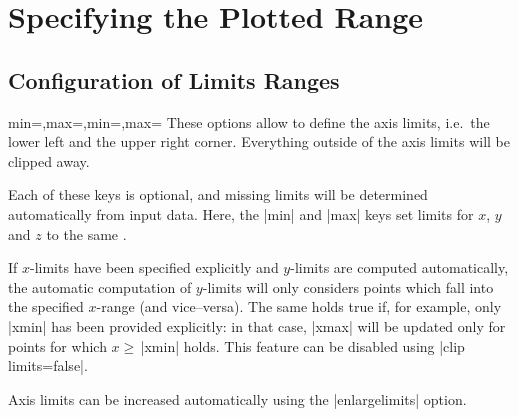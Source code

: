 

\section{Specifying the Plotted Range}

\subsection{Configuration of Limits Ranges}

\begin{pgfplotsxykeylist}{\x min=,\x max=,min=,max=}
These options allow to define the axis limits, i.e.\ the lower left and the upper right corner. Everything outside of the axis limits will be clipped away.

Each of these keys is optional, and missing limits will be determined automatically from input data. Here, the |min| and |max| keys set limits for $x$, $y$ and $z$ to the same .

If $x$-limits have been specified explicitly and $y$-limits are computed automatically, the automatic computation of $y$-limits will only considers points which fall into the specified $x$-range (and vice--versa). The same holds true if, for example, only |xmin| has been provided explicitly: in that case, |xmax| will be updated only for points for which $x \ge \,$|xmin| holds. This feature can be disabled using |clip limits=false|. 

Axis limits can be increased automatically using the |enlargelimits| option.
\begin{codeexample}[]
\end{codeexample}

\begin{codeexample}[]
\end{codeexample}

\begin{codeexample}[]
\end{codeexample}


\end{pgfplotsxykeylist}
